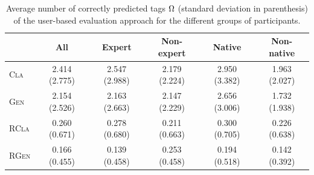 \begin{table}
\footnotesize
  \begin{center}
\footnotesize
\begin{tabular}{lc@{\hskip 0.65cm}cc@{\hskip 0.65cm}cc}
\toprule
	 &  \textbf{All} & \textbf{Expert} & \textbf{Non-expert} & \textbf{Native} & \textbf{Non-native} \\ 
	 \midrule
 	\textsc{Cla} 	& 2.414 (2.775) 	&  2.547 (2.988) 	&  2.179 (2.224) 	&  2.950 (3.382) &  1.963 (2.027) \\ 
	\textsc{Gen} 	& 2.154 (2.526) 	&  2.163 (2.663)	&  2.147 (2.229) 	&  2.656 (3.006) &  1.732 (1.938) \\ 
	\textsc{RCla} 	& 0.260 (0.671) 	&  0.278 (0.680) 	&  0.211 (0.663) 	&  0.300 (0.705) &  0.226 (0.638) \\ 
	\textsc{RGen} 	& 0.166 (0.455) 	&  0.139 (0.458) 	&  0.253 (0.458) 	&  0.194 (0.518) &  0.142 (0.392) \\
	\bottomrule
\end{tabular}
\end{center}
\caption[Average number of correctly predicted tags per recommendation method]{Average number of correctly predicted tags $\Omega$ (standard deviation in parenthesis) of the user-based evaluation approach for the different groups of participants.}
\label{tab:results_general_ub}
\end{table}

